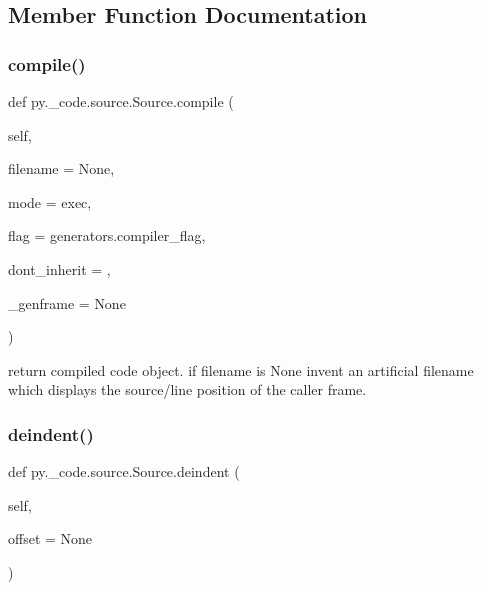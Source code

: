 \subsection{Member Function Documentation}
\mbox{\label{classpy_1_1__code_1_1source_1_1_source_a48b92e89ad7873f768254dadd10092c4}} 
\subsubsection{\texorpdfstring{compile()}{compile()}}
{\footnotesize\ttfamily def py.\+\_\+code.\+source.\+Source.\+compile (\begin{DoxyParamCaption}\item[{}]{self,  }\item[{}]{filename = {\ttfamily None},  }\item[{}]{mode = {\ttfamily \textquotesingle{}exec\textquotesingle{}},  }\item[{}]{flag = {\ttfamily generators.compiler\+\_\+flag},  }\item[{}]{dont\+\_\+inherit = {},  }\item[{}]{\+\_\+genframe = {\ttfamily None} }\end{DoxyParamCaption})}

\begin{DoxyVerb}return compiled code object. if filename is None
    invent an artificial filename which displays
    the source/line position of the caller frame.
\end{DoxyVerb}
 \mbox{\label{classpy_1_1__code_1_1source_1_1_source_a523b7291071984a47617c6c3329d2332}} 
\subsubsection{\texorpdfstring{deindent()}{deindent()}}
{\footnotesize\ttfamily def py.\+\_\+code.\+source.\+Source.\+deindent (\begin{DoxyParamCaption}\item[{}]{self,  }\item[{}]{offset = {\ttfamily None} }\end{DoxyParamCaption})}

